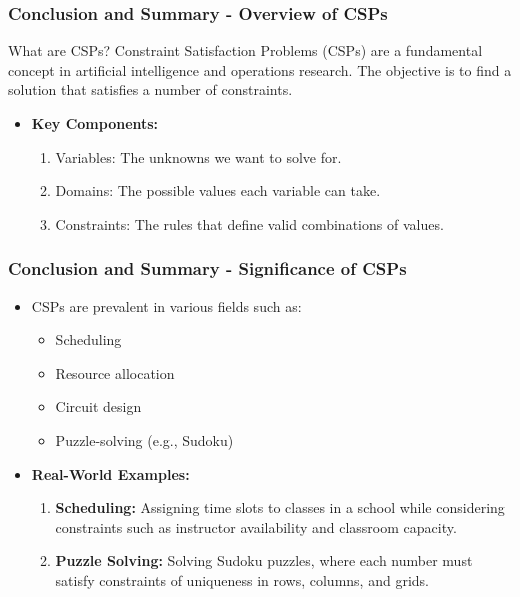 \documentclass[aspectratio=169]{beamer}
\begin{document}
\begin{frame}[fragile]
    \frametitle{Conclusion and Summary - Overview of CSPs}
    \begin{block}{What are CSPs?}
        Constraint Satisfaction Problems (CSPs) are a fundamental concept in artificial intelligence and operations research. The objective is to find a solution that satisfies a number of constraints.
    \end{block}
    
    \begin{itemize}
        \item \textbf{Key Components:}
        \begin{enumerate}
            \item Variables: The unknowns we want to solve for.
            \item Domains: The possible values each variable can take.
            \item Constraints: The rules that define valid combinations of values.
        \end{enumerate}
    \end{itemize}
\end{frame}

\begin{frame}[fragile]
    \frametitle{Conclusion and Summary - Significance of CSPs}
    \begin{itemize}
        \item CSPs are prevalent in various fields such as:
        \begin{itemize}
            \item Scheduling
            \item Resource allocation
            \item Circuit design
            \item Puzzle-solving (e.g., Sudoku)
        \end{itemize}

        \item \textbf{Real-World Examples:}
        \begin{enumerate}
            \item \textbf{Scheduling:} Assigning time slots to classes in a school while considering constraints such as instructor availability and classroom capacity.
            \item \textbf{Puzzle Solving:} Solving Sudoku puzzles, where each number must satisfy constraints of uniqueness in rows, columns, and grids.
        \end{enumerate}
    \end{itemize}
\end{frame}
\end{document}
